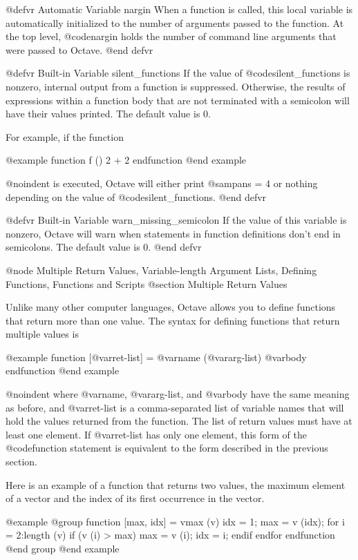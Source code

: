 @defvr {Automatic Variable} nargin
When a function is called, this local variable is automatically
initialized to the number of arguments passed to the function.  At the
top level, @code{nargin} holds the number of command line arguments that
were passed to Octave.
@end defvr

@defvr {Built-in Variable} silent_functions
If the value of @code{silent_functions} is nonzero, internal output
from a function is suppressed.  Otherwise, the results of expressions
within a function body that are not terminated with a semicolon will
have their values printed.  The default value is 0.

For example, if the function

@example
function f ()
  2 + 2
endfunction
@end example

@noindent
is executed, Octave will either print @samp{ans = 4} or nothing
depending on the value of @code{silent_functions}.
@end defvr

@defvr {Built-in Variable} warn_missing_semicolon
If the value of this variable is nonzero, Octave will warn when
statements in function definitions don't end in semicolons.  The default
value is 0.
@end defvr

@node Multiple Return Values, Variable-length Argument Lists, Defining Functions, Functions and Scripts
@section Multiple Return Values

Unlike many other computer languages, Octave allows you to define
functions that return more than one value.  The syntax for defining
functions that return multiple values is

@example
function [@var{ret-list}] = @var{name} (@var{arg-list})
  @var{body}
endfunction
@end example

@noindent
where @var{name}, @var{arg-list}, and @var{body} have the same meaning
as before, and @var{ret-list} is a comma-separated list of variable
names that will hold the values returned from the function.  The list of
return values must have at least one element.  If @var{ret-list} has
only one element, this form of the @code{function} statement is
equivalent to the form described in the previous section.

Here is an example of a function that returns two values, the maximum
element of a vector and the index of its first occurrence in the vector.

@example
@group
function [max, idx] = vmax (v)
  idx = 1;
  max = v (idx);
  for i = 2:length (v)
    if (v (i) > max)
      max = v (i);
      idx = i;
    endif
  endfor
endfunction
@end group
@end example

